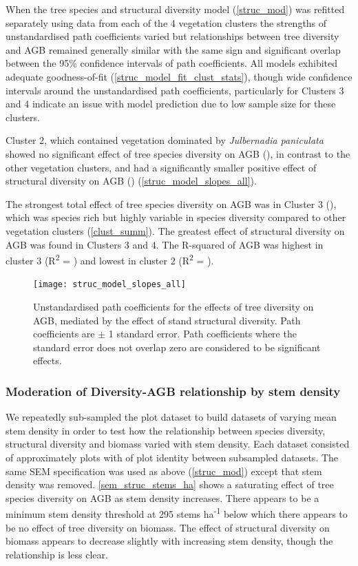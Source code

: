 \documentclass[11pt,a4paper]{article}
\begin{document}
When the tree species and structural diversity model (\autoref{struc_mod}) was refitted separately using data from each of the 4 vegetation clusters the strengths of unstandardised path coefficients varied but relationships between tree diversity and AGB remained generally similar with the same sign and significant overlap between the 95\% confidence intervals of path coefficients. All models exhibited adequate goodness-of-fit (\autoref{struc_model_fit_clust_stats}), though wide confidence intervals around the unstandardised path coefficients, particularly for Clusters 3 and 4 indicate an issue with model prediction due to low sample size for these clusters.

Cluster 2, which contained vegetation dominated by \textit{Julbernadia paniculata} showed no significant effect of tree species diversity on AGB (\strucbsb{}), in contrast to the other vegetation clusters, and had a significantly smaller positive effect of structural diversity on AGB (\strucbhb{}) (\autoref{struc_model_slopes_all}).

The strongest total effect of tree species diversity on AGB was in Cluster 3 (\struccsb{}), which was species rich but highly variable in species diversity compared to other vegetation clusters (\autoref{clust_summ}). The greatest effect of structural diversity on AGB was found in Clusters 3 and 4. The R-squared of AGB was highest in cluster 3 (R\textsuperscript{2} = \struccrsq{}) and lowest in cluster 2 (R\textsuperscript{2} = \strucbrsq{}).

\begin{figure}[H]
\centering
	\texttt{[image: struc\_model\_slopes\_all]}
	\caption{Unstandardised path coefficients for the effects of tree diversity on AGB, mediated by the effect of stand structural diversity. Path coefficients are $\pm$ 1 standard error. Path coefficients where the standard error does not overlap zero are considered to be significant effects.}
	\label{struc_model_slopes_all}
\end{figure}




\subsubsection{Moderation of Diversity-AGB relationship by stem density}

We repeatedly sub-sampled the plot dataset to build \subn{} datasets of varying mean stem density in order to test how the relationship between species diversity, structural diversity and biomass varied with stem density. Each dataset consisted of approximately \subp{} plots with of plot identity between subsampled datasets. The same SEM specification was used as above (\autoref{struc_mod}) except that stem density was removed.  \autoref{sem_struc_stems_ha} shows a saturating effect of tree species diversity on AGB as stem density increases. There appears to be a minimum stem density threshold at \textapprox{}295 stems ha\textsuperscript{-1} below which there appears to be no effect of tree diversity on biomass. The effect of structural diversity on biomass appears to decrease slightly with increasing stem density, though the relationship is less clear.
\end{document}

